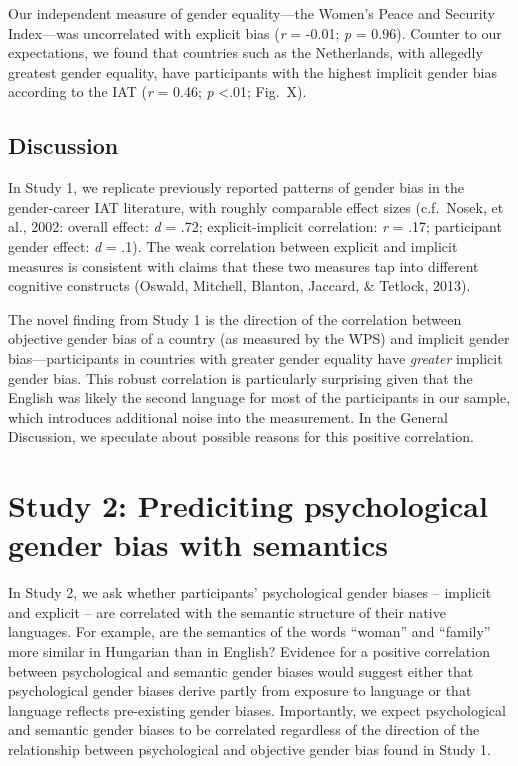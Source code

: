 \documentclass[10pt, letterpaper]{article}
\begin{document}
Our independent measure of gender equality---the Women's Peace and
Security Index---was uncorrelated with explicit bias (\emph{r} = -0.01;
\emph{p} = 0.96). Counter to our expectations, we found that countries
such as the Netherlands, with allegedly greatest gender equality, have
participants with the highest implicit gender bias according to the IAT
(\emph{r} = 0.46; \emph{p} \textless{}.01; Fig.~X).

\subsection{Discussion}\label{discussion}

In Study 1, we replicate previously reported patterns of gender bias in
the gender-career IAT literature, with roughly comparable effect sizes
(c.f.~Nosek, et al., 2002: overall effect: \emph{d} = .72;
explicit-implicit correlation: \emph{r} = .17; participant gender
effect: \emph{d} = .1). The weak correlation between explicit and
implicit measures is consistent with claims that these two measures tap
into different cognitive constructs (Oswald, Mitchell, Blanton, Jaccard,
\& Tetlock, 2013).

The novel finding from Study 1 is the direction of the correlation
between objective gender bias of a country (as measured by the WPS) and
implicit gender bias---participants in countries with greater gender
equality have \emph{greater} implicit gender bias. This robust
correlation is particularly surprising given that the English was likely
the second language for most of the participants in our sample, which
introduces additional noise into the measurement. In the General
Discussion, we speculate about possible reasons for this positive
correlation.

\section{Study 2: Prediciting psychological gender bias with
semantics}\label{study-2-prediciting-psychological-gender-bias-with-semantics}

In Study 2, we ask whether participants' psychological gender biases --
implicit and explicit -- are correlated with the semantic structure of
their native languages. For example, are the semantics of the words
``woman'' and ``family'' more similar in Hungarian than in English?
Evidence for a positive correlation between psychological and semantic
gender biases would suggest either that psychological gender biases
derive partly from exposure to language or that language reflects
pre-existing gender biases. Importantly, we expect psychological and
semantic gender biases to be correlated regardless of the direction of
the relationship between psychological and objective gender bias found
in Study 1.
\end{document}
